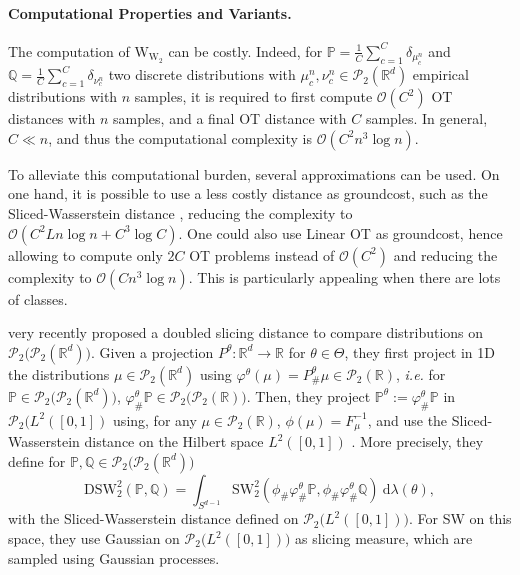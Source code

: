 \documentclass[twoside]{article}
\newcommand{\cP}{\mathcal{P}}
\newcommand{\bP}{\mathbb{P}}
\newcommand{\bQ}{\mathbb{Q}}
\newcommand{\Ww}{\W_{\W_2}}
\newcommand{\cO}{\mathcal{O}}
\newcommand{\cPP}[1]{\mathcal{P}_2\big(\cP_2(#1)\big)}
\newcommand{\W}{\mathrm{W}}
\newcommand{\R}{\mathbb{R}}
\newcommand{\sw}{\mathrm{SW}}
\begin{document}
\paragraph{Computational Properties and Variants.}

The computation of $\Ww$ can be costly. Indeed, for $\bP=\frac1C\sum_{c=1}^C\delta_{\mu_c^n}$ and $\bQ=\frac1C\sum_{c=1}^C \delta_{\nu_c^n}$ two discrete distributions with $\mu_c^n,\nu_c^n\in\cP_2(\R^d)$ empirical distributions with $n$ samples, it is required to first compute $\cO(C^2)$ OT distances with $n$ samples, and a final OT distance with $C$ samples. In general, $C\ll n$, and thus the computational complexity is $\cO(C^2 n^3\log n)$. 

To alleviate this computational burden, several approximations can be used. On one hand, it is possible to use a less costly distance as groundcost, such as the Sliced-Wasserstein distance \citep{baouan2025optimal, piening2025slicing}, reducing the complexity to $\cO(C^2 Ln\log n + C^3\log C)$. One could also use Linear OT \citep{wang2013linear, liu2025wasserstein} as groundcost, hence allowing to compute only $2C$ OT problems instead of $\cO(C^2)$ and reducing the complexity to $\cO(C n^3 \log n)$. This is particularly appealing when there are lots of classes.


\citet{piening2025slicingWoW} very recently proposed a doubled slicing distance to compare distributions on $\cPP{\R^d}$. Given a projection $P^\theta:\R^d\to\R$ for $\theta\in \Theta$, they first project in 1D the distributions $\mu\in\cP_2(\R^d)$ using $\varphi^\theta(\mu)=P^\theta_\#\mu\in\cP_2(\R)$, \emph{i.e.} for $\bP\in\cPP{\R^d}$, $\varphi^\theta_\#\bP\in\cPP{\R}$. Then, they project $\bP^\theta :=\varphi^\theta_\#\bP$ in $\cP_2(L^2([0,1])$ using, for any $\mu\in\cP_2(\R)$, $\phi(\mu)=F_\mu^{-1}$, and use the Sliced-Wasserstein distance on the Hilbert space $L^2([0,1])$ \citep{han2023sliced}. More precisely, they define for $\bP,\bQ\in\cPP{\R^d}$
\begin{equation}
    \mathrm{DSW}_2^2(\bP,\bQ)= \int_{S^{d-1}}\sw_2^2(\phi_\#\varphi^\theta_\#\bP,\phi_\#\varphi^\theta_\#\bQ)\ \mathrm{d}\lambda(\theta),
\end{equation}
with the Sliced-Wasserstein distance defined on $\cP_2\big(L^2([0,1])\big)$. For SW on this space, they use Gaussian on $\cP_2\big(L^2([0,1])\big)$ as slicing measure, which are sampled using Gaussian processes.
\end{document}
